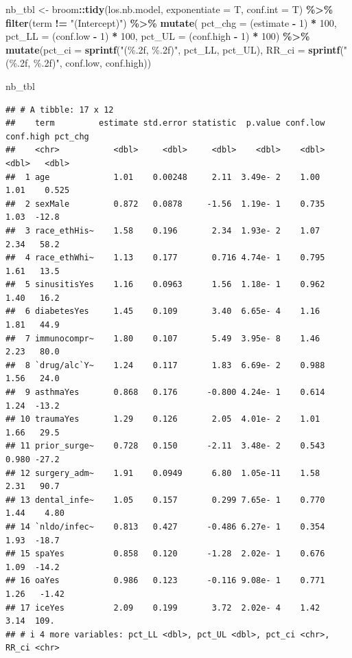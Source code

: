 \documentclass[
]{article}
\newenvironment{Shaded}{\begin{snugshade}}{\end{snugshade}}
\newcommand{\AttributeTok}[1]{\textcolor[rgb]{0.13,0.29,0.53}{#1}}
\newcommand{\DecValTok}[1]{\textcolor[rgb]{0.00,0.00,0.81}{#1}}
\newcommand{\FunctionTok}[1]{\textcolor[rgb]{0.13,0.29,0.53}{\textbf{#1}}}
\newcommand{\NormalTok}[1]{#1}
\newcommand{\OtherTok}[1]{\textcolor[rgb]{0.56,0.35,0.01}{#1}}
\newcommand{\SpecialCharTok}[1]{\textcolor[rgb]{0.81,0.36,0.00}{\textbf{#1}}}
\newcommand{\StringTok}[1]{\textcolor[rgb]{0.31,0.60,0.02}{#1}}
\begin{document}
\begin{Shaded}
\begin{Highlighting}[]
\NormalTok{nb\_tbl }\OtherTok{\textless{}{-}}\NormalTok{ broom}\SpecialCharTok{::}\FunctionTok{tidy}\NormalTok{(los.nb.model, }\AttributeTok{exponentiate =}\NormalTok{ T, }\AttributeTok{conf.int =}\NormalTok{ T) }\SpecialCharTok{\%\textgreater{}\%}
  \FunctionTok{filter}\NormalTok{(term }\SpecialCharTok{!=} \StringTok{"(Intercept)"}\NormalTok{) }\SpecialCharTok{\%\textgreater{}\%}
  \FunctionTok{mutate}\NormalTok{(}
    \AttributeTok{pct\_chg =}\NormalTok{ (estimate  }\SpecialCharTok{{-}} \DecValTok{1}\NormalTok{) }\SpecialCharTok{*} \DecValTok{100}\NormalTok{,}
    \AttributeTok{pct\_LL =}\NormalTok{ (conf.low }\SpecialCharTok{{-}} \DecValTok{1}\NormalTok{) }\SpecialCharTok{*} \DecValTok{100}\NormalTok{,}
    \AttributeTok{pct\_UL =}\NormalTok{ (conf.high }\SpecialCharTok{{-}} \DecValTok{1}\NormalTok{) }\SpecialCharTok{*} \DecValTok{100}\NormalTok{) }\SpecialCharTok{\%\textgreater{}\%} 
  \FunctionTok{mutate}\NormalTok{(}\AttributeTok{pct\_ci =} \FunctionTok{sprintf}\NormalTok{(}\StringTok{"(\%.2f, \%.2f)"}\NormalTok{, pct\_LL, pct\_UL),}
         \AttributeTok{RR\_ci =} \FunctionTok{sprintf}\NormalTok{(}\StringTok{"(\%.2f, \%.2f)"}\NormalTok{, conf.low, conf.high))}

\NormalTok{nb\_tbl}
\end{Highlighting}
\end{Shaded}

\begin{verbatim}
## # A tibble: 17 x 12
##    term         estimate std.error statistic  p.value conf.low conf.high pct_chg
##    <chr>           <dbl>     <dbl>     <dbl>    <dbl>    <dbl>     <dbl>   <dbl>
##  1 age             1.01    0.00248     2.11  3.49e- 2    1.00      1.01    0.525
##  2 sexMale         0.872   0.0878     -1.56  1.19e- 1    0.735     1.03  -12.8  
##  3 race_ethHis~    1.58    0.196       2.34  1.93e- 2    1.07      2.34   58.2  
##  4 race_ethWhi~    1.13    0.177       0.716 4.74e- 1    0.795     1.61   13.5  
##  5 sinusitisYes    1.16    0.0963      1.56  1.18e- 1    0.962     1.40   16.2  
##  6 diabetesYes     1.45    0.109       3.40  6.65e- 4    1.16      1.81   44.9  
##  7 immunocompr~    1.80    0.107       5.49  3.95e- 8    1.46      2.23   80.0  
##  8 `drug/alc`Y~    1.24    0.117       1.83  6.69e- 2    0.988     1.56   24.0  
##  9 asthmaYes       0.868   0.176      -0.800 4.24e- 1    0.614     1.24  -13.2  
## 10 traumaYes       1.29    0.126       2.05  4.01e- 2    1.01      1.66   29.5  
## 11 prior_surge~    0.728   0.150      -2.11  3.48e- 2    0.543     0.980 -27.2  
## 12 surgery_adm~    1.91    0.0949      6.80  1.05e-11    1.58      2.31   90.7  
## 13 dental_infe~    1.05    0.157       0.299 7.65e- 1    0.770     1.44    4.80 
## 14 `nldo/infec~    0.813   0.427      -0.486 6.27e- 1    0.354     1.93  -18.7  
## 15 spaYes          0.858   0.120      -1.28  2.02e- 1    0.676     1.09  -14.2  
## 16 oaYes           0.986   0.123      -0.116 9.08e- 1    0.771     1.26   -1.42 
## 17 iceYes          2.09    0.199       3.72  2.02e- 4    1.42      3.14  109.   
## # i 4 more variables: pct_LL <dbl>, pct_UL <dbl>, pct_ci <chr>, RR_ci <chr>
\end{verbatim}
\end{document}
